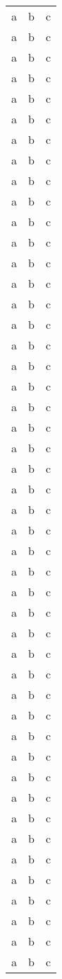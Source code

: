\begin{longtable}{|X|X|X|}
a & b & c\\
a & b & c\\
a & b & c\\
a & b & c\\
a & b & c\\
a & b & c\\
a & b & c\\
a & b & c\\
a & b & c\\
a & b & c\\
a & b & c\\
a & b & c\\
a & b & c\\
a & b & c\\
a & b & c\\
a & b & c\\
a & b & c\\
a & b & c\\
a & b & c\\
a & b & c\\
a & b & c\\
a & b & c\\
a & b & c\\
a & b & c\\
a & b & c\\
a & b & c\\
a & b & c\\
a & b & c\\
a & b & c\\
a & b & c\\
a & b & c\\
a & b & c\\
a & b & c\\
a & b & c\\
a & b & c\\
a & b & c\\
a & b & c\\
a & b & c\\
a & b & c\\
a & b & c\\
a & b & c\\
a & b & c\\
a & b & c\\
a & b & c\\
a & b & c\\
a & b & c\\
a & b & c\\
\end{longtable}

